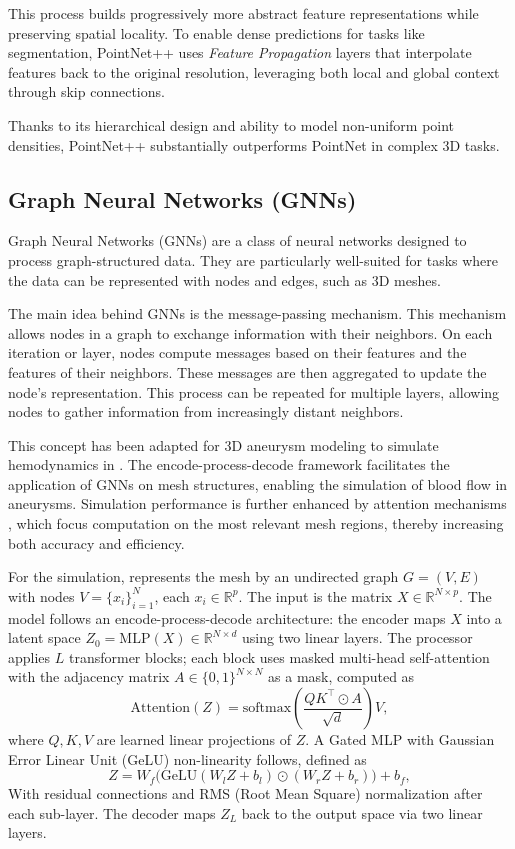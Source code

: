 \documentclass[%
 reprint,
 amsmath,amssymb,
 aps,
 floatfix,
 nofootinbib,
]{revtex4-2}
\begin{document}
This process builds progressively more abstract feature representations while preserving spatial locality. To enable dense predictions for tasks like segmentation, PointNet++ uses \textit{Feature Propagation} layers that interpolate features back to the original resolution, leveraging both local and global context through skip connections.

Thanks to its hierarchical design and ability to model non-uniform point densities, PointNet++ substantially outperforms PointNet in complex 3D tasks.


\subsection{Graph Neural Networks (GNNs)}

Graph Neural Networks (GNNs) are a class of neural networks designed to process graph-structured data. They are particularly well-suited for tasks where the data can be represented with nodes and edges, such as 3D meshes.

The main idea behind GNNs is the message-passing mechanism. This mechanism allows nodes in a graph to exchange information with their neighbors. On each iteration or layer, nodes compute messages based on their features and the features of their neighbors. These messages are then aggregated to update the node's representation. This process can be repeated for multiple layers, allowing nodes to gather information from increasingly distant neighbors.

This concept has been adapted for 3D aneurysm modeling to simulate hemodynamics in \citep{graphphysics}. The encode-process-decode framework facilitates the application of GNNs on mesh structures, enabling the simulation of blood flow in aneurysms. Simulation performance is further enhanced by attention mechanisms \citep{VaswaniSPUJGKP17}, which focus computation on the most relevant mesh regions, thereby increasing both accuracy and efficiency.

For the simulation, \citep{graphphysics} represents the mesh by an undirected graph \( G = (V, E) \) with nodes \( V = \{x_i\}_{i=1}^N \), each \( x_i \in \mathbb{R}^p \). The input is the matrix \( X \in \mathbb{R}^{N \times p} \). The model follows an encode-process-decode architecture: the encoder maps \( X \) into a latent space \( Z_0 = \text{MLP}(X) \in \mathbb{R}^{N \times d} \) using two linear layers. The processor applies \( L \) transformer blocks; each block uses masked multi-head self-attention with the adjacency matrix \( A \in \{0,1\}^{N \times N} \) as a mask, computed as
\[
\text{Attention}(Z) = \text{softmax}\left(\frac{QK^\top \odot A}{\sqrt{d}}\right)V,
\]
where \( Q, K, V \) are learned linear projections of \( Z \). A Gated MLP with Gaussian Error Linear Unit (GeLU) \citep{hendrycks2023gaussianerrorlinearunits} non-linearity follows, defined as
\[
Z = W_f \big( \text{GeLU}(W_l Z + b_l) \odot (W_r Z + b_r) \big) + b_f,
\]
With residual connections and RMS (Root Mean Square)  normalization \citep{zhang2019rootmeansquarelayer} after each sub-layer. The decoder maps \( Z_L \) back to the output space via two linear layers.
\end{document}
